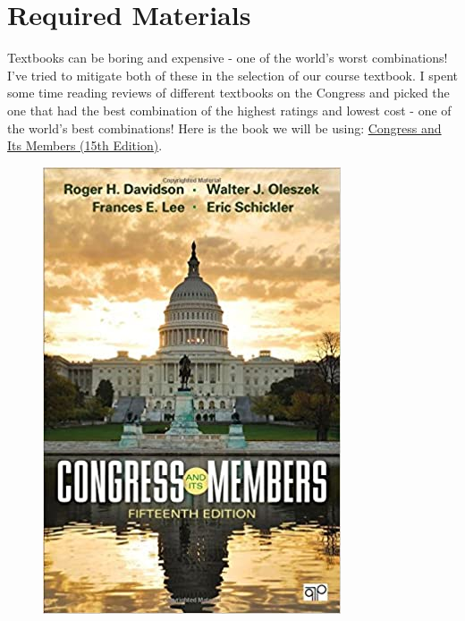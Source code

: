 \documentclass[11pt]{article}
\begin{document}
\section*{Required Materials}

Textbooks can be boring and expensive - one of the world's worst combinations! I've tried to mitigate both of these in the selection of our course textbook. I spent some time reading reviews of different textbooks on the Congress and picked the one that had the best combination of the highest ratings and lowest cost - one of the world's best combinations! Here is the book we will be using: \href{https://www.amazon.com/Congress-Its-Members-Roger-Davidson/dp/1483388883}{Congress and Its Members (15th Edition)}. 

\begin{figure}
\centering
\href{https://www.amazon.com/Congress-Its-Members-Roger-Davidson/dp/1483388883}{\includegraphics[width=0.9\linewidth]{congress.jpg}}
\end{figure}
\end{document}
